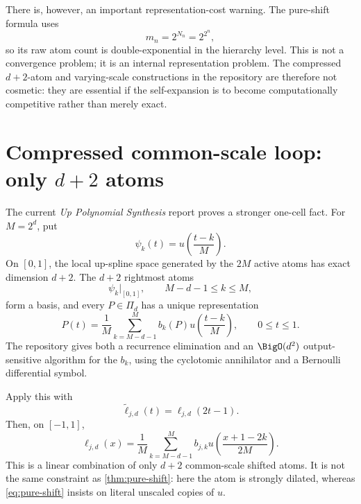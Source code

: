 \documentclass[11pt,oneside]{article}
\numberwithin{equation}{section}
\theoremstyle{definition}
\theoremstyle{remark}
\begin{document}
There is, however, an important representation-cost warning.  The pure-shift
formula uses
\begin{equation}
 m_n=2^{N_n}=2^{2^n},
 \label{eq:double-exp}
\end{equation}
so its raw atom count is double-exponential in the hierarchy level.  This is not a
convergence problem; it is an internal representation problem.  The compressed
\(d+2\)-atom and varying-scale constructions in the repository are therefore not
cosmetic: they are essential if the self-expansion is to become computationally
competitive rather than merely exact.

\section{Compressed common-scale loop: only \(d+2\) atoms}
\label{sec:compressed}
The current \emph{Up Polynomial Synthesis} report proves a stronger one-cell fact.
For \(M=2^d\), put
\begin{equation}
 \psi_k(t)=u\!\left(\frac{t-k}{M}\right).
 \label{eq:psi}
\end{equation}
On \([0,1]\), the local up-spline space generated by the \(2M\) active atoms has
exact dimension \(d+2\).  The \(d+2\) rightmost atoms
\begin{equation}
 \psi_k|_{[0,1]},\qquad M-d-1\le k\le M,
 \label{eq:endpoint-basis-set}
\end{equation}
form a basis, and every \(P\in\Pi_d\) has a unique representation
\begin{equation}
 P(t)=\frac1M\sum_{k=M-d-1}^{M}b_k(P)
 u\!\left(\frac{t-k}{M}\right),\qquad0\le t\le1.
 \label{eq:endpoint-basis}
\end{equation}
The repository gives both a recurrence elimination and an \(\BigO(d^2)\)
output-sensitive algorithm for the \(b_k\), using the cyclotomic annihilator and a
Bernoulli differential symbol.

Apply this with
\begin{equation}
 \widetilde\ell_{j,d}(t)=\ell_{j,d}(2t-1).
 \label{eq:tilde-cardinal}
\end{equation}
Then, on \([-1,1]\),
\begin{equation}
 \boxed{
 \ell_{j,d}(x)=\frac1M\sum_{k=M-d-1}^{M}b_{j,k}
 u\!\left(\frac{x+1-2k}{2M}\right).}
 \label{eq:compressed-cardinal}
\end{equation}
This is a linear combination of only \(d+2\) common-scale shifted atoms.  It is
not the same constraint as \cref{thm:pure-shift}: here the atom is strongly dilated,
whereas \eqref{eq:pure-shift} insists on literal unscaled copies of \(u\).
\end{document}
